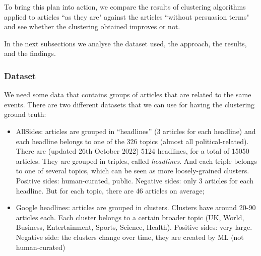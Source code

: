 






To bring this plan into action, we compare the results of  clustering algorithms applied to articles ``as they are" against the articles ``without persuasion terms" and see whether the clustering obtained improves or not.

In the next subsections we analyse the dataset used, the approach, the results, and the findings.



\subsubsection{Dataset}

We need some data that contains groups of articles that are related to the same events. There are two different datasets that we can use for having the clustering ground truth:

\begin{itemize}
    \item AllSides: articles are grouped in “headlines” (3 articles for each headline) and each headline belongs to one of the 326 topics (almost all political-related). There are (updated 26th October 2022) 5124 headlines, for a total of 15050 articles. They are grouped in triples, called \emph{headlines}. And each triple belongs to one of several topics, which can be seen as more loosely-grained clusters. Positive sides: human-curated, public. Negative sides: only 3 articles for each headline. But for each topic, there are 46 articles on average;
    \item Google headlines: articles are grouped in clusters. Clusters have around 20-90 articles each. Each cluster belongs to a certain broader topic (UK, World, Business, Entertainment, Sports, Science, Health). Positive sides: very large. Negative side: the clusters change over time, they are created by ML (not human-curated)
\end{itemize}

